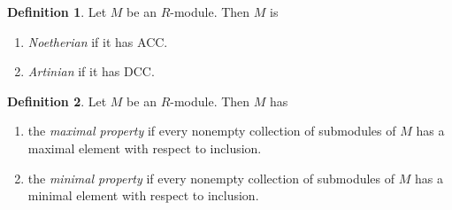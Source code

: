 \documentclass[10pt,letterpaper,cm]{nupset}
\theoremstyle{definition}
\newtheorem{definition}{Definition}[subsection]
\theoremstyle{theorem}
\theoremstyle{remark}
\newcommand{\1}{\mathbf{1}}
\newcommand{\0}{\vec 0}
\newcommand{\dcc}{\textsf{DCC}\xspace}
\newcommand{\acc}{\textsf{ACC}\xspace}
\begin{document}
\begin{definition} Let $M$ be an $R$-module. Then $M$ is
\begin{enumerate}
\item \textit{Noetherian} if it has \acc.
\item \textit{Artinian} if it has \dcc.
\end{enumerate}
\end{definition}

\begin{definition} Let $M$ be an $R$-module. Then $M$ has
\begin{enumerate}
\item the \textit{maximal property} if every nonempty collection of submodules of $M$ has a maximal element with respect to inclusion.
\item the \textit{minimal property} if every nonempty collection of submodules of $M$ has a minimal element with respect to inclusion.
\end{enumerate}
\end{definition}
\end{document}
